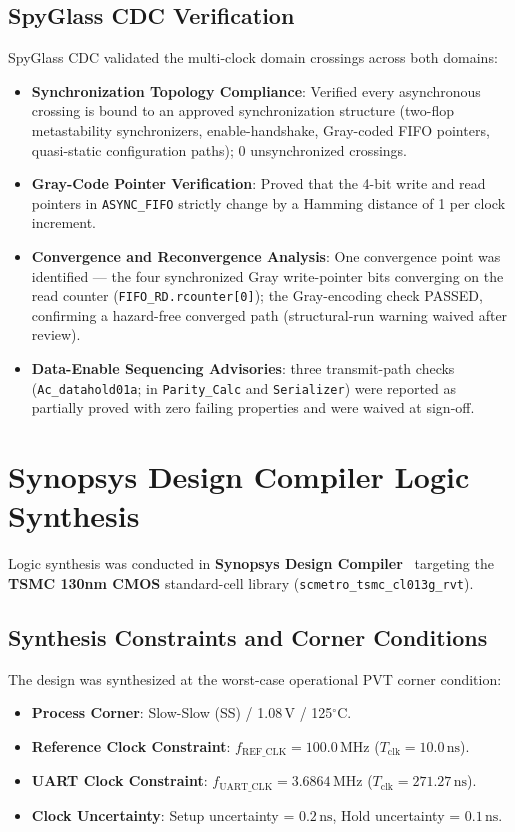 \documentclass[11pt,a4paper]{article}
\begin{document}
\subsection{SpyGlass CDC Verification}
SpyGlass CDC validated the multi-clock domain crossings across both domains:
\begin{itemize}
    \item \textbf{Synchronization Topology Compliance}: Verified every asynchronous crossing is bound to an approved synchronization structure (two-flop metastability synchronizers, enable-handshake, Gray-coded FIFO pointers, quasi-static configuration paths); 0 unsynchronized crossings.
    \item \textbf{Gray-Code Pointer Verification}: Proved that the 4-bit write and read pointers in \texttt{ASYNC\_FIFO} strictly change by a Hamming distance of 1 per clock increment.
    \item \textbf{Convergence and Reconvergence Analysis}: One convergence point was identified --- the four synchronized Gray write-pointer bits converging on the read counter (\texttt{FIFO\_RD.rcounter[0]}); the Gray-encoding check PASSED, confirming a hazard-free converged path (structural-run warning waived after review).
    \item \textbf{Data-Enable Sequencing Advisories}: three transmit-path checks (\texttt{Ac\_datahold01a}; in \texttt{Parity\_Calc} and \texttt{Serializer}) were reported as partially proved with zero failing properties and were waived at sign-off.
\end{itemize}

\section{Synopsys Design Compiler Logic Synthesis}

Logic synthesis was conducted in \textbf{Synopsys Design Compiler}~\cite{synopsys_dc} targeting the \textbf{TSMC 130nm CMOS} standard-cell library (\texttt{scmetro\_tsmc\_cl013g\_rvt}).

\subsection{Synthesis Constraints and Corner Conditions}
The design was synthesized at the worst-case operational PVT corner condition:
\begin{itemize}
    \item \textbf{Process Corner}: Slow-Slow (SS) / 1.08\,V / 125$^\circ$C.
    \item \textbf{Reference Clock Constraint}: $f_{\text{REF\_CLK}} = 100.0\,\text{MHz}$ ($T_{\text{clk}} = 10.0\,\text{ns}$).
    \item \textbf{UART Clock Constraint}: $f_{\text{UART\_CLK}} = 3.6864\,\text{MHz}$ ($T_{\text{clk}} = 271.27\,\text{ns}$).
    \item \textbf{Clock Uncertainty}: Setup uncertainty = $0.2\,\text{ns}$, Hold uncertainty = $0.1\,\text{ns}$.
\end{itemize}
\end{document}

